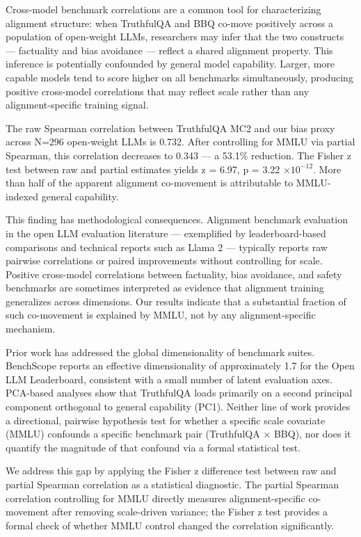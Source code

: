 
Cross-model benchmark correlations are a common tool for characterizing alignment structure: when TruthfulQA and BBQ co-move positively across a population of open-weight LLMs, researchers may infer that the two constructs --- factuality and bias avoidance --- reflect a shared alignment property. This inference is potentially confounded by general model capability. Larger, more capable models tend to score higher on all benchmarks simultaneously, producing positive cross-model correlations that may reflect scale rather than any alignment-specific training signal.

The raw Spearman correlation between TruthfulQA MC2 and our bias proxy across N=296 open-weight LLMs is 0.732. After controlling for MMLU via partial Spearman, this correlation decreases to 0.343 --- a 53.1\% reduction. The Fisher z test between raw and partial estimates yields z = 6.97, p = 3.22 $\times 10^{-12}$. More than half of the apparent alignment co-movement is attributable to MMLU-indexed general capability.

This finding has methodological consequences. Alignment benchmark evaluation in the open LLM evaluation literature --- exemplified by leaderboard-based comparisons and technical reports such as Llama 2 \citep{Touvron2023} --- typically reports raw pairwise correlations or paired improvements without controlling for scale. Positive cross-model correlations between factuality, bias avoidance, and safety benchmarks are sometimes interpreted as evidence that alignment training generalizes across dimensions. Our results indicate that a substantial fraction of such co-movement is explained by MMLU, not by any alignment-specific mechanism.

Prior work has addressed the global dimensionality of benchmark suites. BenchScope \citep{Sha2026} reports an effective dimensionality of approximately 1.7 for the Open LLM Leaderboard, consistent with a small number of latent evaluation axes. PCA-based analyses \citep{clawrxiv2603} show that TruthfulQA loads primarily on a second principal component orthogonal to general capability (PC1). Neither line of work provides a directional, pairwise hypothesis test for whether a specific scale covariate (MMLU) confounds a specific benchmark pair (TruthfulQA $\times$ BBQ), nor does it quantify the magnitude of that confound via a formal statistical test.

We address this gap by applying the Fisher z difference test between raw and partial Spearman correlation as a statistical diagnostic. The partial Spearman correlation controlling for MMLU directly measures alignment-specific co-movement after removing scale-driven variance; the Fisher z test provides a formal check of whether MMLU control changed the correlation significantly.

